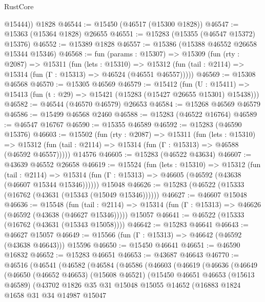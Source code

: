 \begin{lexlean}{RustCore}
\begin{coremodule}
        @15444))
    @1828
@46544 := @15450 (@46517 (@15300 @1828))
@46547 := @15363 (@15364 @1828) @26655
@46551 := @15283 (@15355 (@46547 @15372) @15376)
@46552 := @15389 @1828
@46557 := @15386 (@15388 @46552 @26658 @15344 @15346)
@46568 := fun (params : @15307) =>
  @15309
    (fun (rty : @2087) =>
    @15311
      (fun (lets : @15310) =>
      @15312 (fun (tail : @2114) => @15314 (fun (Γ : @15313) => @46524 (@46551 @46557)))))
@46569 := @15308 @46568
@46570 := @15305 @46569
@46579 := @15412
    (fun (U : @15411) => @15413 (fun (t : @29) => @15421 (@15283 (@15427 @26655 @15301) @15438)))
@46582 := @46544 (@46570 @46579) @26653
@46584 := @15268 @46569 @46579
@46586 := @15499 @46568 @2460
@46588 := @15283 (@46522 @16764)
@46589 := @46547 @16767
@46590 := @15355 @46589
@46592 := @15283 (@46590 @15376)
@46603 := @15502
    (fun (rty : @2087) =>
    @15311
      (fun (lets : @15310) =>
      @15312 (fun (tail : @2114) => @15314 (fun (Γ : @15313) => @46588 (@46592 @46557)))))
    @14576
@46605 := @15283 (@46522 @43634)
@46607 := @43639 @46552 @26658
@46619 := @15524
    (fun (lets : @15310) =>
    @15312
      (fun (tail : @2114) =>
      @15314 (fun (Γ : @15313) => @46605 (@46592 (@43638 (@46607 @15344 @15346))))))
    @15048
@46626 := @15283 (@46522 (@15333 (@16762 (@43631 (@15343 (@15049 @15346))))))
@46627 := @46607 @15048
@46636 := @15548
    (fun (tail : @2114) => @15314 (fun (Γ : @15313) => @46626 (@46592 (@43638 (@46627 @15346)))))
    @15057
@46641 := @46522 (@15333 (@16762 (@43631 (@15343 @15058))))
@46642 := @15283 @46641
@46643 := @46627 @15057
@46649 := @15566 (fun (Γ : @15313) => @46642 (@46592 (@43638 @46643))) @15596
@46650 := @15450 @46641
@46651 := @46590 @16832
@46652 := @15283 @46651
@46653 := @43687 @46643
@46770 := @46516
    (@46541
      (@46582
        (@46584
          (@46586
            (@46603
              (@46619
                (@46636
                  (@46649
                    (@46650
                      (@46652 @46653)
                      (@15608 @46521)
                      (@15450
                        @46651
                        @46653
                        (@15613 @46589)
                        (@43702
                          @1826
                          @35
                          @31
                          @15048
                          @15055
                          @14652
                          (@16883
                            @1824
                            @1658
                            @31
                            @34
                            @14987
                            @15047

\end{coremodule}
\end{lexlean}
